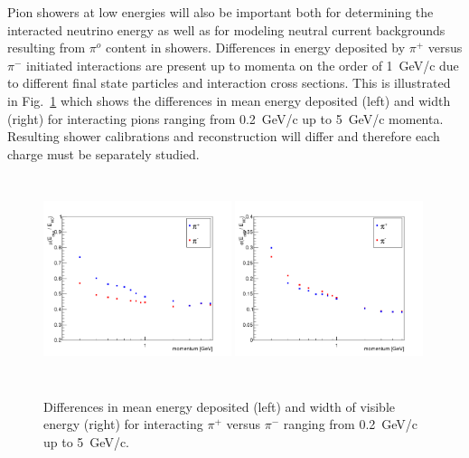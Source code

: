 Pion showers at low energies will also be important both for determining the interacted neutrino energy as well
as for modeling neutral current backgrounds resulting from $\pi^o$ content in showers. Differences in energy deposited
by $\pi^+$ versus $\pi^-$ initiated interactions are present up to momenta on the order of 1~GeV/c due to different
final state particles and interaction cross sections. This is illustrated in 
Fig.~\ref{fig:pionshwr} which shows the differences in mean energy deposited (left) and width (right) 
for interacting pions ranging from 0.2~GeV/c up to 5~GeV/c momenta.
Resulting shower calibrations and reconstruction will differ and therefore each charge must be separately
studied. 
\begin{figure}[h!]
  \centering
\includegraphics[width=0.49\textwidth,height=6.0cm]{figures/pipimean}
\includegraphics[width=0.49\textwidth,height=6.0cm]{figures/pipisigma}
  \caption{Differences in mean energy deposited (left) and width of visible energy (right) 
for interacting $\pi^+$ versus $\pi^-$ ranging from 0.2~GeV/c up to 5~GeV/c. 
}
\label{fig:pionshwr}
\end{figure}


